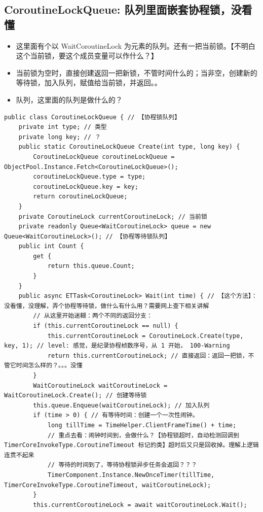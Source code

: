 \documentclass[9pt, b5paper]{article}
\begin{document}
\subsection{CoroutineLockQueue: 队列里面嵌套协程锁，没看懂}
\label{sec-14-4}
\begin{itemize}
\item 这里面有个以 WaitCoroutineLock 为元素的队列。还有一把当前锁。【不明白这个当前锁，要这个成员变量可以作什么？】
\item 当前锁为空时，直接创建返回一把新锁，不管时间什么的；当非空，创建新的等待锁，加入队列，赋值给当前锁，并返回。。
\item 队列，这里面的队列是做什么的？
\end{itemize}
\begin{verbatim}
public class CoroutineLockQueue { // 【协程锁队列】
    private int type; // 类型
    private long key; // ？
    public static CoroutineLockQueue Create(int type, long key) {
        CoroutineLockQueue coroutineLockQueue = ObjectPool.Instance.Fetch<CoroutineLockQueue>();
        coroutineLockQueue.type = type;
        coroutineLockQueue.key = key;
        return coroutineLockQueue;
    }
    private CoroutineLock currentCoroutineLock; // 当前锁
    private readonly Queue<WaitCoroutineLock> queue = new Queue<WaitCoroutineLock>(); // 【协程等待锁队列】
    public int Count {
        get {
            return this.queue.Count;
        }
    }
    public async ETTask<CoroutineLock> Wait(int time) { // 【这个方法】：没看懂，没理解，弄个协程等待锁，做什么有什么用？需要网上查下相关讲解
        // 从这里开始迷糊：两个不同的返回分支：
        if (this.currentCoroutineLock == null) {
            this.currentCoroutineLock = CoroutineLock.Create(type, key, 1); // level: 感觉，是纪录协程桢数序号，从 1 开始， 100-Warning
            return this.currentCoroutineLock; // 直接返回：返回一把锁，不管它时间怎么样的？。。。没懂
        }
        WaitCoroutineLock waitCoroutineLock = WaitCoroutineLock.Create(); // 创建等待锁
        this.queue.Enqueue(waitCoroutineLock); // 加入队列
        if (time > 0) { // 有等待时间：创建一个一次性闹钟。
            long tillTime = TimeHelper.ClientFrameTime() + time;
            // 重点去看：闹钟时间到，会做什么？【协程锁超时，自动检测回调到TimerCoreInvokeType.CoroutineTimeout 标记的类】超时后又只是回收掉。理解上逻辑连贯不起来
            // 等待的时间到了，等待协程锁异步任务会返回？？？
            TimerComponent.Instance.NewOnceTimer(tillTime, TimerCoreInvokeType.CoroutineTimeout, waitCoroutineLock);
        }
        this.currentCoroutineLock = await waitCoroutineLock.Wait();

\end{verbatim}
\end{document}
